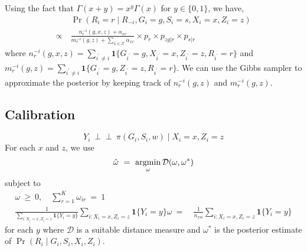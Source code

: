 \documentclass[11pt]{article}
\theoremstyle{plain}
\newcommand{\ind}{\mbox{$\perp\!\!\!\perp$}}
\newcommand{\argmin}{\operatornamewithlimits{argmin}}
\newcommand\spacingset[1]{\renewcommand{\baselinestretch}%
  {#1}\small\normalsize}
\newcommand{\cX}{\mathcal{X}}
\begin{document}
Using the fact that $\Gamma(x+y)=x^y\Gamma(x)$ for $y \in \{0,1\}$, we
have,
\begin{align}
  & \Pr(R_i = r \mid R_{-i}, G_i = g, S_i = s, X_i = x, Z_i = z) \\
  \propto \ &
              \frac{n_r^{-i}(g,x,z)+\alpha_{xr}}{m_r^{-i}(g,z)+\sum_{x
              \in \cX}\alpha_{xr}} \times p_r \times p_{zg|r}
              \times p_{s|r}
\end{align}
where
$n_r^{-i}(g,x,z) = \sum_{i^\prime\ne i} \mathbf{1}\{G_{i^\prime} = g,
X_{i^\prime} = x, Z_{i^\prime} = z, R_{i^\prime} = r\}$ and
$m_r^{-i}(g,z)=\sum_{i^\prime\ne i} \mathbf{1}\{G_{i^\prime} = g,
Z_{i^\prime} = z, R_{i^\prime} = r\}$.  We can use the Gibbs sampler
to approximate the posterior by keeping track of $n_r^{-i}(g,z)$ and
$m_r^{-i}(g,z)$.

\subsection{Calibration}

\begin{equation}
  Y_i \ \ind \ \pi(G_i, S_i, w) \mid X_i = x, Z_i = z
\end{equation}
For each $x$ and $z$, we use
\begin{equation}
\hat{\omega} \ = \  \argmin_\omega \mathcal{D}(\omega, \omega^\ast)
\end{equation}
subject to
\begin{align}
  \omega \ \ge \ 0, \quad \sum_{r=1}^K \omega_{ir} \ = \ 1 & \\
  \frac{1}{\sum_{i: X_i = x, Z_i = z} \mathbf{1}\{Y_i = y\}} \sum_{i:
  X_i  = x, Z_i = z}
  \mathbf{1}\{Y_i = y\} \omega \ = \ & \frac{1}{n_{xw}} \sum_{i: X_i = x, Z_i = z} \mathbf{1}\{Y_i = y\}
\end{align}
for each $y$ where $\mathcal{D}$ is a suitable distance measure and
$\omega^\ast$ is the posterior estimate of
$\Pr(R_i \mid G_i, S_i, X_i, Z_i)$.

\spacingset{1.5}

\end{document}
